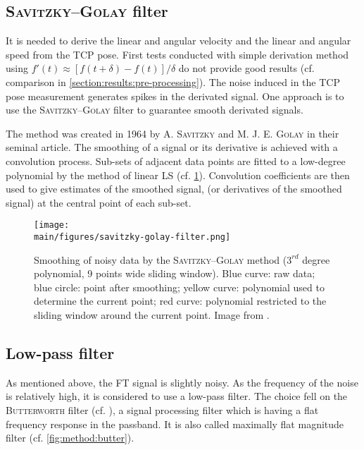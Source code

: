 \documentclass[/home/francois/latex/report/main.tex]{subfiles}
\begin{document}
\subsection{\textsc{Savitzky–Golay} filter}

It is needed to derive the linear and angular velocity and the linear and angular speed from the \ac{TCP} pose. First tests conducted with simple derivation method using $f'(t) \approx  [f(t+\delta) - f(t)] / \delta$ do not provide good results (cf. comparison in \ref{section:results:pre-processing}). The noise induced in the \ac{TCP} pose measurement generates spikes in the derivated signal. One approach is to use the \textsc{Savitzky–Golay} filter to guarantee smooth derivated signals.

The method was created in 1964 by A. \textsc{Savitzky} and M. J. E. \textsc{Golay} \cite{Savitzky1964} in their seminal article. The smoothing of a signal or its derivative is achieved with a convolution process. Sub-sets of adjacent data points are fitted to a low-degree polynomial by the method of linear \ac{LS} (cf. \ref{fig:method:savit}). Convolution coefficients are then used to give estimates of the smoothed signal, (or derivatives of the smoothed signal) at the central point of each sub-set.

\begin{figure}[h]
  \centering
  \texttt{[image: \\main/figures/savitzky-golay-filter.png]}
  \caption{Smoothing of noisy data by the \textsc{Savitzky–Golay} method ($3^{rd}$ degree polynomial, 9 points wide sliding window). Blue curve: raw data; blue circle: point after smoothing; yellow curve: polynomial used to determine the current point; red curve: polynomial restricted to the sliding window around the current point. Image from \cite{Cdang2013}.}
  \label{fig:method:savit}
\end{figure}

\subsection{Low-pass filter}

As mentioned above, the \ac{FT} signal is slightly noisy. As the frequency of the noise is relatively high, it is considered to use a low-pass filter. The choice fell on the \textsc{Butterworth} filter (cf. \cite{filter1923}), a signal processing filter which is having a flat frequency response in the passband. It is also called maximally flat magnitude filter (cf. \ref{fig:method:butter}).
\end{document}
